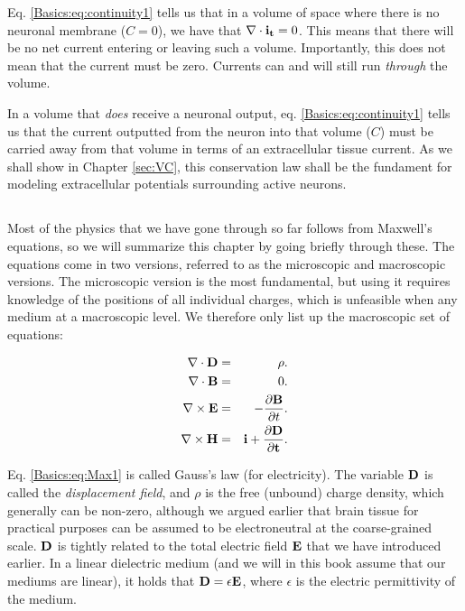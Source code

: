 Eq. \ref{Basics:eq:continuity1} tells us that in a volume of space where there is no neuronal membrane ($C = 0$), we have that $\nabla \cdot {\bf i_t} = 0$. This means that there will be no net current entering or leaving such a volume. Importantly, this does not mean that the current must be zero. Currents can and will still run \textit{through} the volume.

In a volume that \textit{does} receive a neuronal output, eq. \ref{Basics:eq:continuity1} tells us that the current outputted from the neuron into that volume ($C$) must be carried away from that volume in terms of an extracellular tissue current. As we shall show in Chapter \ref{sec:VC}, this conservation law shall be the fundament for modeling extracellular potentials surrounding active neurons.


\subsection{}
\label{sec:Basics:Maxwell} 
Most of the physics that we have gone through so far follows from Maxwell's equations, so we will summarize this chapter by going briefly through these. The equations come in two versions, referred to as the microscopic and macroscopic versions. The microscopic version is the most fundamental, but using it requires knowledge of the positions of all individual charges, which is unfeasible when any medium at a macroscopic level. We therefore only list up the macroscopic set of equations: 

\begin{eqnarray}
\nabla\cdot {\bf D} & = & \rho. \label{Basics:eq:Max1} \\
\nabla \cdot {\bf B} & = & 0.  \label{Basics:eq:Max2} \\
\nabla \times {\bf E} & = & - \frac{\partial {\bf B}}{\partial t}.  \label{Basics:eq:Max3} \\
\nabla \times {\bf H} & = & \bf{i} + \frac{\partial {\bf D}}{\partial t}.  \label{Basics:eq:Max4}
\label{Basics:eq:Maxwell}
\end{eqnarray}

Eq. \ref{Basics:eq:Max1} is called Gauss's law (for electricity). The variable ${\bf D}$ is called the \textit{displacement field}, and $\rho$ is the free (unbound) charge density, which generally can be non-zero, although we argued earlier that brain tissue for practical purposes can be assumed to be electroneutral at the coarse-grained scale. ${\bf D}$ is tightly related to the total electric field ${\bf E}$ that we have introduced earlier. In a linear dielectric medium (and we will in this book assume that our mediums are linear), it holds that ${\bf D} = \epsilon {\bf E}$, where $\epsilon$ is the electric permittivity of the medium. 

